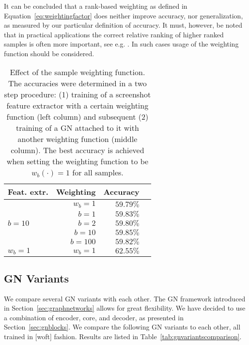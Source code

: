 It can be concluded that a rank-based weighting as defined in Equation~\ref{eq:weightingfactor} does neither improve accuracy, nor generalization, as measured by our particular definition of accuracy. It must, however, be noted that in practical applications the correct relative ranking of higher ranked samples is often more important, see e.g. \cite{tfranking}. In such cases usage of the weighting function should be considered.

\begin{table}
    \centering
    \begin{tabular}{lrrr}
        \textbf{Feat. extr.} & \textbf{Weighting} & \textbf{Accuracy}\\\hline
        & $w_b=1$ & $59.79\%$\\
        & $b=1$ & $59.83\%$\\
        $b=10$ & $b=2$ & $59.80\%$\\
        & $b=10$ & $59.85\%$\\
        & $b=100$ & $59.82\%$\\\hline
        $w_b=1$ & $w_b=1$ & $62.55\%$\\
        
    \end{tabular}
    \caption[Effect of the sample weighting function]{Effect of the sample weighting function. The accuracies were determined in a two step procedure: (1) training of a screenshot feature extractor with a certain weighting function (left column) and subsequent (2) training of a GN attached to it with another weighting function (middle column). The best accuracy is achieved when setting the weighting function to be $w_b(\cdot)=1$ for all samples. }
    \label{tab:weightingbase}
\end{table}

\subsection{GN Variants}

We compare several GN variants with each other. The GN framework introduced in Section~\ref{sec:graphnetworks} allows for great flexibility. We have decided to use a combination of encoder, core, and decoder, as presented in Section~\ref{sec:gnblocks}.
We compare the following GN variants to each other, all trained in [woft] fashion. Results are listed in Table~\ref{tab:gnvariantscomparison}.

